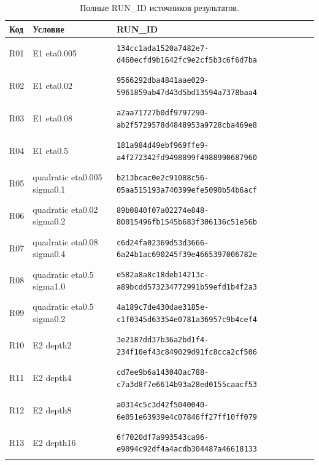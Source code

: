 \begin{longtable}{@{}l>{\raggedright\arraybackslash}p{3.5cm}p{10.8cm}@{}}
\caption{Полные RUN\_ID источников результатов.}\\
\toprule Код & Условие & RUN\_ID \\ \midrule \endhead
\hypertarget{R01}{R01} & E1 eta0.005 & {\fontsize{8.8}{11}\selectfont\texttt{134cc1ada1520a7482e7-d460ecfd9b1642fc9e2cf5b3c6f6d7ba}} \\
\hypertarget{R02}{R02} & E1 eta0.02 & {\fontsize{8.8}{11}\selectfont\texttt{9566292dba4841aae029-5961859ab47d43d5bd13594a7378baa4}} \\
\hypertarget{R03}{R03} & E1 eta0.08 & {\fontsize{8.8}{11}\selectfont\texttt{a2aa71727b0df9797290-ab2f5729578d4848953a9728cba469e8}} \\
\hypertarget{R04}{R04} & E1 eta0.5 & {\fontsize{8.8}{11}\selectfont\texttt{181a984d49ebf969ffe9-a4f272342fd9498899f4988990687960}} \\
\hypertarget{R05}{R05} & quadratic eta0.005 sigma0.1 & {\fontsize{8.8}{11}\selectfont\texttt{b213bcac0e2c91088c56-05aa515193a740399efe5090b54b6acf}} \\
\hypertarget{R06}{R06} & quadratic eta0.02 sigma0.2 & {\fontsize{8.8}{11}\selectfont\texttt{89b0840f07a02274e848-80015496fb1545b683f306136c51e56b}} \\
\hypertarget{R07}{R07} & quadratic eta0.08 sigma0.4 & {\fontsize{8.8}{11}\selectfont\texttt{c6d24fa02369d53d3666-6a24b1ac690245f39e4665397006782e}} \\
\hypertarget{R08}{R08} & quadratic eta0.5 sigma1.0 & {\fontsize{8.8}{11}\selectfont\texttt{e582a8a8c18deb14213c-a89bcdd573234772991b59efd1b4f2a3}} \\
\hypertarget{R09}{R09} & quadratic eta0.5 sigma0.2 & {\fontsize{8.8}{11}\selectfont\texttt{4a189c7de430dae3185e-c1f0345d63354e0781a36957c9b4cef4}} \\
\hypertarget{R10}{R10} & E2 depth2 & {\fontsize{8.8}{11}\selectfont\texttt{3e2187dd37b36a2bd1f4-234f10ef43c849029d91fc8cca2cf506}} \\
\hypertarget{R11}{R11} & E2 depth4 & {\fontsize{8.8}{11}\selectfont\texttt{cd7ee9b6a143040ac788-c7a3d8f7e6614b93a28ed0155caacf53}} \\
\hypertarget{R12}{R12} & E2 depth8 & {\fontsize{8.8}{11}\selectfont\texttt{a0314c5c3d42f5040040-6e051e63939e4c07846ff27ff10ff079}} \\
\hypertarget{R13}{R13} & E2 depth16 & {\fontsize{8.8}{11}\selectfont\texttt{6f7020df7a993543ca96-e9094c92df4a4acdb304487a46618133}} \\

\end{longtable}
